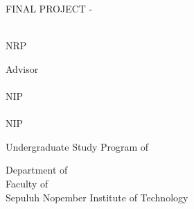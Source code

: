 \begin{flushleft}

  \sffamily

  \selectfont
  \begin{spacing}{1.5}
   \begin{large}
  FINAL PROJECT - \coursecode{}
\end{large}

\vspace{\fill}

\begin{spacing}{1.5}
  \begin{Large}
    \engtatitle{}
  \end{Large}
\end{spacing}

\vspace{\fill}

\begin{large}
  \name{} \\
  \textmd{NRP \nrp{}}
\end{large}

\vspace{\fill}

\begin{large}
  \textmd{Advisor} \\
  \advisor{} \\
  \textmd{NIP \advisornip{}} \\
  \coadvisor{} \\
  \textmd{NIP \coadvisornip{}}
\end{large}

\vspace{\fill}

Undergraduate Study Program of \engstudyprogram{} \\

\mdseries

Department of \engdepartment{} \\
Faculty of \engfaculty{} \\
Sepuluh Nopember Institute of Technology

\place{} \\ \the\year{}

  \end{spacing}

\end{flushleft}

\restoregeometry
